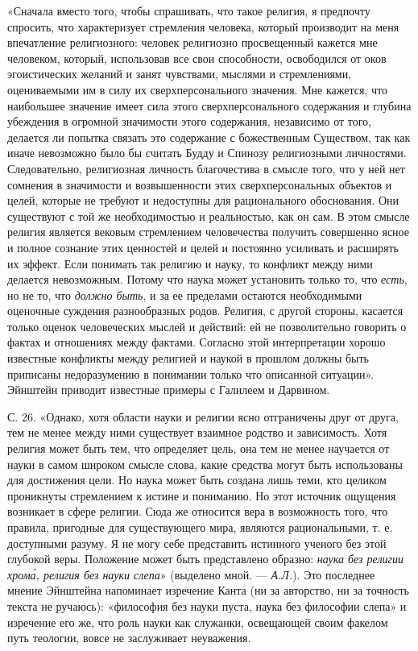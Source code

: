 «Сначала  вместо   того,  чтобы  спрашивать,  что   такое  религия,  я
предпочту  спросить, что  характеризует  стремления человека,  который
производит  на  меня   впечатление  религиозного:  человек  религиозно
просвещенный  кажется мне  человеком,  который,  использовав все  свои
способности,  освободился  от  оков   эгоистических  желаний  и  занят
чувствами,  мыслями   и  стремлениями,  оцениваемыми  им   в  силу  их
сверхперсонального  значения.  Мне  кажется, что  наибольшее  значение
имеет сила  этого сверхперсонального содержания и  глубина убеждения в
огромной  значимости этого  содержания, независимо  от того,  делается
ли  попытка  связать  это  содержание с  божественным  Существом,  так
как  иначе невозможно  было бы  считать Будду  и Спинозу  религиозными
личностями. Следовательно, религиозная  личность благочестива в смысле
того,  что  у ней  нет  сомнения  в  значимости и  возвышенности  этих
сверхперсональных объектов  и целей,  которые не требуют  и недоступны
для рационального обоснования. Они  существуют с той же необходимостью
и  реальностью, как  он сам.  В этом  смысле религия  является вековым
стремлением человечества  получить совершенно ясное и  полное сознание
этих ценностей  и целей и  постоянно усиливать и расширять  их эффект.
Если понимать  так религию  и науку, то  конфликт между  ними делается
невозможным.  Потому  что  наука   может  установить  только  то,  что
\emph{есть},  но не  то, что  \emph{должно  быть}, и  за ее  пределами
остаются необходимыми оценочные суждения разнообразных родов. Религия,
с  другой  стороны,  касается  только  оценок  человеческих  мыслей  и
действий: ей  не позволительно  говорить о  фактах и  отношениях между
фактами. Согласно этой интерпретации  хорошо известные конфликты между
религией  и наукой  в прошлом  должны быть  приписаны недоразумению  в
понимании только что описанной  ситуации». Эйнштейн приводит известные
примеры с Галилеем и Дарвином.

С. 26.  «Однако, хотя  области науки и  религии ясно  отграничены друг
от  друга, тем  не  менее  между ними  существует  взаимное родство  и
зависимость. Хотя религия может быть тем, что определяет цель, она тем
не  менее научается  от  науки  в самом  широком  смысле слова,  какие
средства могут быть  использованы для достижения цели.  Но наука может
быть создана лишь теми, кто  целиком проникнуты стремлением к истине и
пониманию. Но этот  источник ощущения возникает в  сфере религии. Сюда
же  относится вера  в  возможность того,  что  правила, пригодные  для
существующего мира, являются рациональными, т. е. доступными разуму. Я
не могу  себе представить  истинного ученого  без этой  глубокой веры.
Положение  может быть  представлено образно:  \emph{наука без  религии
хром\'{а}, религия без науки слепа}» (выделено мной. --- \emph{А.Л.}).
Это  последнее  мнение Эйнштейна  напоминает  изречение  Канта (ни  за
авторство, ни  за точность  текста не  ручаюсь): «философия  без науки
пуста, наука без  философии слепа» и изречение его же,  что роль науки
как  служанки,  освещающей  своим  факелом  путь  теологии,  вовсе  не
заслуживает неуважения.

